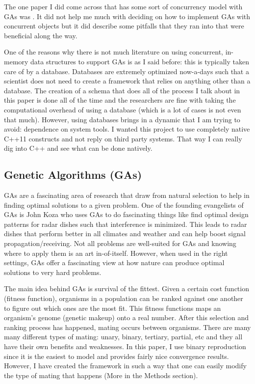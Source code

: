 \documentclass{acm_proc_article-sp}
\begin{document}
The one paper I did come across that has some sort of concurrency model with GAs was \cite{Koppen:paper1}. It did not help me much with deciding on how to implement GAs with concurrent objects but it did describe some pitfalls that they ran into that were beneficial along the way.

One of the reasons why there is not much literature on using concurrent, in-memory data structures to support GAs is as I said before: this is typically taken care of by a database. Databases are extremely optimized now-a-days such that a scientist does not need to create a framework that relies on anything other than a database. The creation of a schema that does all of the process I talk about in this paper is done all of the time and the researchers are fine with taking the computational overhead of using a database (which is a lot of cases is not even that much). However, using databases brings in a dynamic that I am trying to avoid: dependence on system tools. I wanted this project to use completely native C++11 constructs and not reply on third party systems. That way I can really dig into C++ and see what can be done natively.

\subsection{Genetic Algorithms (GAs)}

GAs are a fascinating area of research that draw from natural selection to help in finding optimal solutions to a given problem. One of the founding evangelists of GAs is John Koza who uses GAs to do fascinating things like find optimal design patterns for radar dishes such that interference is minimized. This leads to radar dishes that perform better in all climates and weather and can help boost signal propagation/receiving. Not all problems are well-suited for GAs and knowing where to apply them is an art in-of-itself. However, when used in the right settings, GAs offer a fascinating view at how nature can produce optimal solutions to very hard problems.

The main idea behind GAs is survival of the fittest. Given a certain cost function (fitness function), organisms in a population can be ranked against one another to figure out which ones are the most fit. This fitness functions maps an organism's genome (genetic makeup) onto a real number. After this selection and ranking process has happened, mating occurs between organisms. There are many many different types of mating: unary, binary, tertiary, partial, etc and they all have their own benefits and weaknesses. In this paper, I use binary reproduction since it is the easiest to model and provides fairly nice convergence results. However, I have created the framework in such a way that one can easily modify the type of mating that happens (More in the Methods section).
\end{document}
